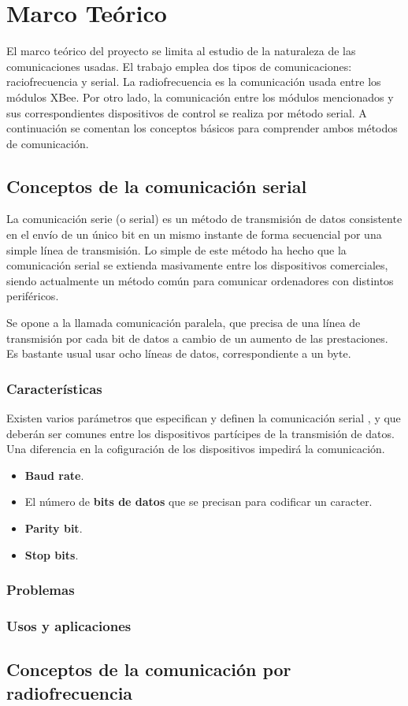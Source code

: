 \chapter{Marco Teórico}

El marco teórico del proyecto se limita al estudio de la naturaleza de las comunicaciones usadas. El trabajo emplea dos tipos de comunicaciones: raciofrecuencia y serial. La radiofrecuencia es la comunicación usada entre los módulos XBee. Por otro lado, la comunicación entre los módulos mencionados y sus correspondientes dispositivos de control se realiza por método serial. A continuación se comentan los conceptos básicos para comprender ambos métodos de comunicación.

\section{Conceptos de la comunicación serial}

La comunicación serie (o serial) es un método de transmisión de datos consistente en el envío de un único bit en un mismo instante de forma secuencial por una simple línea de transmisión. Lo simple de este método ha hecho que la comunicación serial se extienda masivamente entre los dispositivos comerciales, siendo actualmente un método común para comunicar ordenadores con distintos periféricos.

Se opone a la llamada comunicación paralela, que precisa de una línea de transmisión por cada bit de datos a cambio de un aumento de las prestaciones. Es bastante usual usar ocho líneas de datos, correspondiente a un byte.

\subsection{Características}

Existen varios parámetros que especifican y definen la comunicación serial \cite{NI:2004}, y que deberán ser comunes entre los dispositivos partícipes de la transmisión de datos. Una diferencia en la cofiguración de los dispositivos impedirá la comunicación.

\begin{itemize}
\item \textbf{Baud rate}.
\item El número de \textbf{bits de datos} que se precisan para codificar un caracter.
\item \textbf{Parity bit}.
\item \textbf{Stop bits}.
\end{itemize}

\subsection{Problemas}


\subsection{Usos y aplicaciones}


\section{Conceptos de la comunicación por radiofrecuencia}